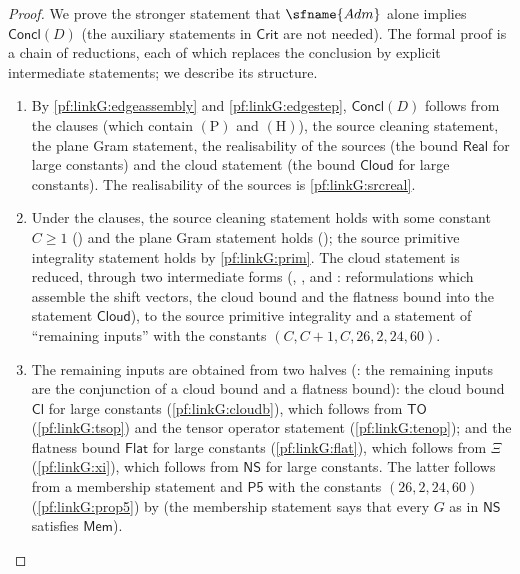 \begin{proof}
We prove the stronger statement that $\sfname{Adm}$ alone implies $\mathsf{Concl}(D)$ (the auxiliary
statements in $\mathsf{Crit}$ are not needed). The formal proof is a chain of
reductions, each of which replaces the conclusion by explicit intermediate statements; we describe its structure.
\begin{enumerate}[label=(\arabic*)]
\item By \cref{pf:linkG:edgeassembly} and \cref{pf:linkG:edgestep}, $\mathsf{Concl}(D)$ follows from the clauses
(which contain $(\mathrm P)$ and $(\mathrm H)$), the source cleaning statement, the plane Gram statement, the
realisability of the sources (the bound $\mathsf{Real}$ for large constants) and the cloud statement (the bound
$\mathsf{Cloud}$ for large constants). The realisability of the sources is \cref{pf:linkG:srcreal}.
\item Under the clauses, the source cleaning statement holds with some constant $C\ge1$
() and the plane Gram statement holds
(); the source primitive integrality statement
holds by \cref{pf:linkG:prim}. The cloud statement is reduced, through two intermediate forms
(, , and :
reformulations which assemble the shift vectors, the cloud bound and the flatness bound into the statement $\mathsf{Cloud}$),
to the source primitive integrality and a statement of ``remaining inputs'' with the constants $(C,C+1,C,26,2,24,60)$.
\item The remaining inputs are obtained from two halves
(: the remaining inputs are the conjunction of a
cloud bound and a flatness bound): the cloud bound $\mathsf{Cl}$ for large constants (\cref{pf:linkG:cloudb}), which
follows from $\mathsf{TO}$ (\cref{pf:linkG:tsop}) and the tensor operator statement (\cref{pf:linkG:tenop}); and the
flatness bound $\mathsf{Flat}$ for large constants (\cref{pf:linkG:flat}), which follows from $\Xi$ (\cref{pf:linkG:xi}),
which follows from $\mathsf{NS}$ for large constants. The latter follows from a membership statement and $\mathsf{P5}$ with the
constants $(26,2,24,60)$ (\cref{pf:linkG:prop5}) by  (the membership
statement says that every $G$ as in $\mathsf{NS}$ satisfies $\mathsf{Mem}$).

\end{enumerate}
\end{proof}
